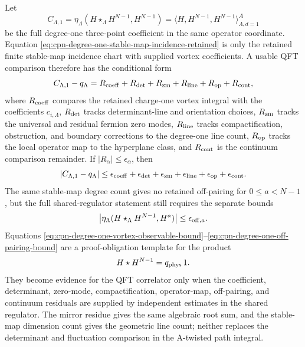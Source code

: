 \begin{remark}
Let
\[
  C_{\Lambda,1}
  =
  \eta_\Lambda(H\star_\Lambda H^{N-1},H^{N-1})
  =
  \big\langle H,H^{N-1},H^{N-1}\big\rangle_{\Lambda,d=1}^{A}
\]
be the full degree-one three-point coefficient in the same operator coordinate.
Equation \eqref{eq:cpn-degree-one-stable-map-incidence-retained} is only the
retained finite stable-map incidence chart with supplied vortex coefficients.
A usable QFT comparison therefore has the conditional
form
\begin{equation}
  C_{\Lambda,1}-q_\Lambda
  =
  R_{\rm coeff}
  +R_{\rm det}
  +R_{\rm zm}
  +R_{\rm line}
  +R_{\rm op}
  +R_{\rm cont},
  \label{eq:cpn-degree-one-vortex-observable-telescope}
\end{equation}
where \(R_{\rm coeff}\) compares the retained charge-one vortex integral with
the coefficients \(c_{i,\Lambda}\), \(R_{\rm det}\) tracks determinant-line and
orientation choices, \(R_{\rm zm}\) tracks the universal and residual fermion
zero modes, \(R_{\rm line}\) tracks compactification, obstruction, and boundary
corrections to the degree-one line count, \(R_{\rm op}\) tracks the local
operator map to the hyperplane class, and \(R_{\rm cont}\) is the continuum
comparison remainder.  If \(|R_\alpha|\le\epsilon_\alpha\), then
\begin{equation}
  |C_{\Lambda,1}-q_\Lambda|
  \le
  \epsilon_{\rm coeff}
  +\epsilon_{\rm det}
  +\epsilon_{\rm zm}
  +\epsilon_{\rm line}
  +\epsilon_{\rm op}
  +\epsilon_{\rm cont}.
  \label{eq:cpn-degree-one-vortex-observable-bound}
\end{equation}
The same stable-map degree count gives no retained off-pairing for
\(0\le a<N-1\), but the full shared-regulator statement still requires the
separate bounds
\begin{equation}
  \left|
    \eta_\Lambda(H\star_\Lambda H^{N-1},H^a)
  \right|
  \le \epsilon_{{\rm off},a}.
  \label{eq:cpn-degree-one-off-pairing-bound}
\end{equation}
Equations
\eqref{eq:cpn-degree-one-vortex-observable-bound}--\eqref{eq:cpn-degree-one-off-pairing-bound}
are a proof-obligation template for the product
\[
  H\star H^{N-1}=q_{\rm phys}\,1.
\]
They become evidence for the QFT correlator only when the coefficient,
determinant, zero-mode, compactification, operator-map, off-pairing, and
continuum residuals are supplied by independent estimates in the shared
regulator.  The mirror residue gives the same algebraic root sum, and the
stable-map dimension count gives the geometric line count; neither replaces the
determinant and fluctuation comparison in the A-twisted path integral.
\end{remark}

